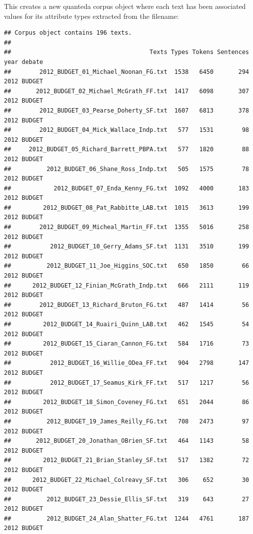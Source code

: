 \documentclass[11pt]{article}
\begin{document}
This creates a new quanteda corpus object where each text has been associated values for its attribute types extracted from the filename:

\begin{knitrout}
\color{fgcolor}\begin{kframe}
\begin{alltt}
\end{alltt}
\begin{verbatim}
## Corpus object contains 196 texts.
## 
##                                       Texts Types Tokens Sentences year debate
##        2012_BUDGET_01_Michael_Noonan_FG.txt  1538   6450       294 2012 BUDGET
##       2012_BUDGET_02_Michael_McGrath_FF.txt  1417   6098       307 2012 BUDGET
##        2012_BUDGET_03_Pearse_Doherty_SF.txt  1607   6813       378 2012 BUDGET
##        2012_BUDGET_04_Mick_Wallace_Indp.txt   577   1531        98 2012 BUDGET
##     2012_BUDGET_05_Richard_Barrett_PBPA.txt   577   1820        88 2012 BUDGET
##          2012_BUDGET_06_Shane_Ross_Indp.txt   505   1575        78 2012 BUDGET
##            2012_BUDGET_07_Enda_Kenny_FG.txt  1092   4000       183 2012 BUDGET
##         2012_BUDGET_08_Pat_Rabbitte_LAB.txt  1015   3613       199 2012 BUDGET
##        2012_BUDGET_09_Micheal_Martin_FF.txt  1355   5016       258 2012 BUDGET
##           2012_BUDGET_10_Gerry_Adams_SF.txt  1131   3510       199 2012 BUDGET
##          2012_BUDGET_11_Joe_Higgins_SOC.txt   650   1850        66 2012 BUDGET
##      2012_BUDGET_12_Finian_McGrath_Indp.txt   666   2111       119 2012 BUDGET
##        2012_BUDGET_13_Richard_Bruton_FG.txt   487   1414        56 2012 BUDGET
##         2012_BUDGET_14_Ruairi_Quinn_LAB.txt   462   1545        54 2012 BUDGET
##         2012_BUDGET_15_Ciaran_Cannon_FG.txt   584   1716        73 2012 BUDGET
##           2012_BUDGET_16_Willie_ODea_FF.txt   904   2798       147 2012 BUDGET
##           2012_BUDGET_17_Seamus_Kirk_FF.txt   517   1217        56 2012 BUDGET
##         2012_BUDGET_18_Simon_Coveney_FG.txt   651   2044        86 2012 BUDGET
##          2012_BUDGET_19_James_Reilly_FG.txt   708   2473        97 2012 BUDGET
##       2012_BUDGET_20_Jonathan_OBrien_SF.txt   464   1143        58 2012 BUDGET
##         2012_BUDGET_21_Brian_Stanley_SF.txt   517   1382        72 2012 BUDGET
##      2012_BUDGET_22_Michael_Colreavy_SF.txt   306    652        30 2012 BUDGET
##          2012_BUDGET_23_Dessie_Ellis_SF.txt   319    643        27 2012 BUDGET
##          2012_BUDGET_24_Alan_Shatter_FG.txt  1244   4761       187 2012 BUDGET

\end{verbatim}
\end{kframe}
\end{knitrout}
\end{document}
